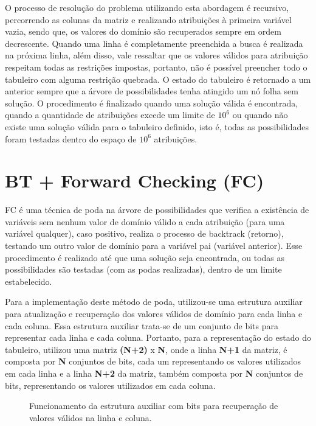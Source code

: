 \documentclass[9pt,technote,compsoc]{IEEEtran}
\begin{document}
O processo de resolução do problema utilizando esta abordagem é recursivo, percorrendo as colunas da matriz e realizando atribuições à primeira variável vazia, sendo que, os valores do domínio são recuperados sempre em ordem decrescente. Quando uma linha é completamente preenchida a busca é realizada na próxima linha, além disso, vale ressaltar que os valores válidos para atribuição respeitam todas as restrições impostas, portanto, não é possível preencher todo o tabuleiro com alguma restrição quebrada. O estado do tabuleiro é retornado a um anterior sempre que a árvore de possibilidades tenha atingido um nó folha sem solução. O procedimento é finalizado quando uma solução válida é encontrada, quando a quantidade de atribuições excede um limite de $10^{6}$ ou quando não existe uma solução válida para o tabuleiro definido, isto é, todas as possibilidades foram testadas dentro do espaço de $10^{6}$ atribuições.


\section{BT + Forward Checking (FC)} \label{fc}
FC é uma técnica de poda na árvore de possibilidades que verifica a existência de variáveis sem nenhum valor de domínio válido a cada atribuição (para uma variável qualquer), caso positivo, realiza o processo de backtrack (retorno), testando um outro valor de domínio para a variável pai (variável anterior). Esse procedimento é realizado até que uma solução seja encontrada, ou todas as possibilidades são testadas (com as podas realizadas), dentro de um limite estabelecido.

Para a implementação deste método de poda, utilizou-se uma estrutura auxiliar para atualização e recuperação dos valores válidos de domínio para cada linha e cada coluna. Essa estrutura auxiliar trata-se de um conjunto de bits para representar cada linha e cada coluna. Portanto, para a representação do estado do tabuleiro, utilizou uma matriz \textbf{(N+2)} x \textbf{N}, onde a linha \textbf{N+1} da matriz, é composta por \textbf{N} conjuntos de bits, cada um representando os valores utilizados em cada linha e a linha \textbf{N+2} da matriz, também composta por \textbf{N} conjuntos de bits, representando os valores utilizados em cada coluna.

\begin{figure}[H]
\caption{Funcionamento da estrutura auxiliar com bits para recuperação de valores válidos na linha e coluna.}
\label{bitmask}
\end{figure} 
\end{document}
